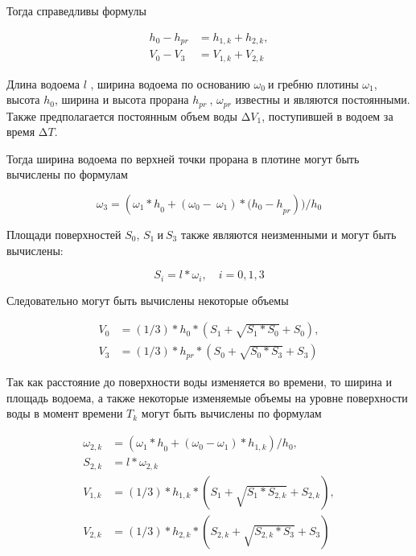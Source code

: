 \begin{multicols}{2}
Тогда справедливы формулы

\begin{equation}
\begin{aligned}
h_{0} - h_{pr} &= h_{1,k} + h_{2,k}, \\
V_{0} - V_{3} &= V_{1,k} + V_{2,k}
\end{aligned}
\end{equation}

Длина водоема \(l\) , ширина водоема по основанию \(\omega_{0}\ \)и
гребню плотины \(\omega_{1}\), высота \(h_{0}\), ширина и высота прорана
\(h_{pr}\ \), \(\omega_{pr}\) известны и являются постоянными. Также
предполагается постоянным объем воды \(\mathrm{\Delta}V_{1}\),
поступившей в водоем за время \(\mathrm{\Delta}T\).

Тогда ширина водоема по верхней точки прорана в плотине могут быть
вычислены по формулам

\begin{equation}
\omega_{3} = ({\omega_{1}*h}_{0} + \left( \omega_{0} - \ \omega_{1} \right)*{(h_{0} - h}_{pr}))/h_{0}
\end{equation}

Площади поверхностей \(S_{0}\), \(S_{1}\ и\ S_{3}\) также являются
неизменными и могут быть вычислены:

\begin{equation}
S_{i} = l*\omega_{i},\quad i = 0,1,3
\end{equation}

Следовательно могут быть вычислены некоторые объемы

\begin{equation}
\begin{aligned}
V_{0} &= (1/3)*h_{0}*\left( S_{1} + \sqrt{S_{1}*S_{0}} + S_{0} \right), \\
V_{3} &= (1/3)*h_{pr}*\left( S_{0} + \sqrt{S_{0}*S_{3}} + S_{3} \right)
\end{aligned}
\end{equation}

Так как расстояние до поверхности воды изменяется во времени, то ширина
и площадь водоема, а также некоторые изменяемые объемы на уровне
поверхности воды в момент времени \(T_{k}\) могут быть вычислены по
формулам

\begin{equation}
\begin{aligned}
\omega_{2,k} &= ({\omega_{1}*h}_{0} + \left( \omega_{0} - \omega_{1} \right)*h_{1,k})/h_{0}, \\
S_{2,k} &= l*\omega_{2,k} \\
V_{1,k} &= (1/3)*h_{1,k}*\left( S_{1} + \sqrt{S_{1}*S_{2,k}} + S_{2,k} \right), \\
V_{2,k} &= (1/3)*h_{2,k}*\left( S_{2,k} + \sqrt{S_{2,k}*S_{3}} + S_{3} \right)
\end{aligned}
\end{equation}


\end{multicols}
